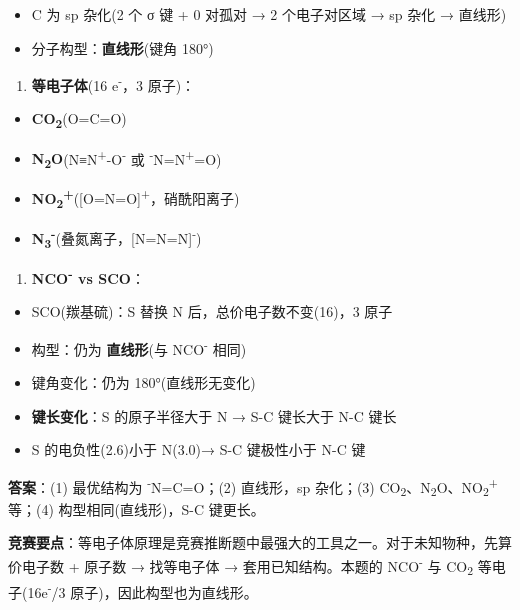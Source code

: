 \begin{itemize}
\tightlist
\item
  C 为 sp 杂化(2 个 σ 键 + 0 对孤对 → 2 个电子对区域 → sp 杂化 → 直线形)
\item
  分子构型：\textbf{直线形}(键角 180°)
\end{itemize}

\begin{enumerate}
\def\labelenumi{(\arabic{enumi})}
\setcounter{enumi}{2}
\tightlist
\item
  \textbf{等电子体}(16 e\textsuperscript{-}，3 原子)：
\end{enumerate}

\begin{itemize}
\tightlist
\item
  \textbf{CO\textsubscript{2}}(O=C=O)
\item
  \textbf{N\textsubscript{2}O}(N≡N\textsuperscript{+}-O\textsuperscript{-} 或 \textsuperscript{-}N=N\textsuperscript{+}=O)
\item
  \textbf{NO\textsubscript{2}\textsuperscript{+}}({[}O=N=O{]}\textsuperscript{+}，硝酰阳离子)
\item
  \textbf{N\textsubscript{3}\textsuperscript{-}}(叠氮离子，{[}N=N=N{]}\textsuperscript{-})
\end{itemize}

\begin{enumerate}
\def\labelenumi{(\arabic{enumi})}
\setcounter{enumi}{3}
\tightlist
\item
  \textbf{NCO\textsuperscript{-} vs SCO}：
\end{enumerate}

\begin{itemize}
\tightlist
\item
  SCO(羰基硫)：S 替换 N 后，总价电子数不变(16)，3 原子
\item
  构型：仍为 \textbf{直线形}(与 NCO\textsuperscript{-} 相同)
\item
  键角变化：仍为 180°(直线形无变化)
\item
  \textbf{键长变化}：S 的原子半径大于 N → S-C 键长大于 N-C 键长
\item
  S 的电负性(2.6)小于 N(3.0)→ S-C 键极性小于 N-C 键
\end{itemize}

\textbf{答案}：(1) 最优结构为 \textsuperscript{-}N=C=O；(2) 直线形，sp 杂化；(3) CO\textsubscript{2}、N\textsubscript{2}O、NO\textsubscript{2}\textsuperscript{+} 等；(4) 构型相同(直线形)，S-C 键更长。

\textbf{竞赛要点}：等电子体原理是竞赛推断题中最强大的工具之一。对于未知物种，先算价电子数 + 原子数 → 找等电子体 → 套用已知结构。本题的 NCO\textsuperscript{-} 与 CO\textsubscript{2} 等电子(16e\textsuperscript{-}/3 原子)，因此构型也为直线形。

